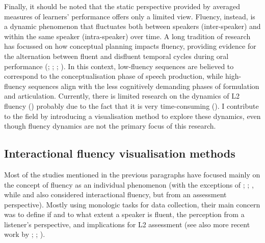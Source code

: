 Finally, it should be noted that the static perspective provided by averaged measures of learners’ performance offers only a limited view. Fluency, instead, is a dynamic phenomenon that fluctuates both between speakers (inter-speaker) and within the same speaker (intra-speaker) over time. A long tradition of research has focussed on how conceptual planning impacts fluency, providing evidence for the alternation between fluent and disfluent temporal cycles during oral performance (\citealt{HendersonGoldman-EislerSkarbek1966}; \citealt{Goldman-Eisler1967}; \citealt{Butterworth1975}; \citealt{Beattie1980}). In this context, low-fluency sequences are believed to correspond to the conceptualisation phase of speech production, while high-fluency sequences align with the less cognitively demanding phases of formulation and articulation. Currently, there is limited research on the dynamics of L2 fluency (\citealt{DeJong2023}) probably due to the fact that it is very time-consuming (\citealt{RobertsKirsner2000}). I contribute to the field by introducing a visualisation method to explore these dynamics, even though fluency dynamics are not the primary focus of this research.

\subsection{Interactional fluency visualisation methods}
\label{sec:3.1.4}
Most of the studies mentioned in the previous paragraphs have focused mainly on the concept of fluency as an individual phenomenon (with the exceptions of \citealt{Riggenbach1991}; \citealt{Tavakoli2016}; \citealt{Peltonen2017}, while \citealt{Peltonen2022} and \citealt{Sato2014} also considered interactional fluency, but from an assessment perspective). Mostly using monologic tasks for data collection, their main concern was to define if and to what extent a speaker is fluent, the perception from a listener’s perspective, and implications for L2 assessment (see also more recent work by \citealt{Götz2013}; \citealt{Kahng2014}; \citealt{PeltonenLintunen2016}).

